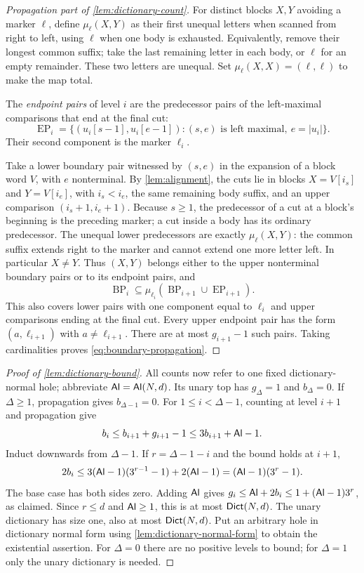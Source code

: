 \begin{proof}[Propagation part of \cref{lem:dictionary-count}]
For distinct blocks $X,Y$ avoiding a marker $\ell$, define
$\mu_\ell(X,Y)$ as their first unequal letters when scanned from right
to left, using $\ell$ when one body is exhausted. Equivalently, remove
their longest common suffix; take the last remaining letter in each body,
or $\ell$ for an empty remainder. These two letters are unequal.
Set $\mu_\ell(X,X)=(\ell,\ell)$ to make the map total.

The \emph{endpoint pairs} of level $i$ are the predecessor pairs of the
left-maximal comparisons that end at the final cut:
\[
 \operatorname{EP}_i=\{(u_i[s-1],u_i[e-1]):
       (s,e)\text{ is left maximal},\ e=|u_i|\}.
\]
Their second component is the marker $\ell_i$.

Take a lower boundary pair witnessed by $(s,e)$ in the expansion of a
block word $V$, with $e$ nonterminal. By \cref{lem:alignment}, the cuts
lie in blocks $X=V[i_s]$ and $Y=V[i_e]$, with $i_s<i_e$, the same
remaining body suffix, and an upper comparison $(i_s+1,i_e+1)$.
Because $s\ge1$, the predecessor of a cut at a block's beginning is the
preceding marker; a cut inside a body has its ordinary predecessor.
The unequal lower predecessors are exactly $\mu_\ell(X,Y)$: the common
suffix extends right to the marker and cannot extend one more letter left.
In particular $X\ne Y$. Thus $(X,Y)$ belongs either to the upper
nonterminal boundary pairs or to its endpoint pairs, and
\[
 \operatorname{BP}_i\subseteq
 \mu_{\ell_i}(\operatorname{BP}_{i+1}\cup\operatorname{EP}_{i+1}).
\]
This also covers lower pairs with one component equal to $\ell_i$ and
upper comparisons ending at the final cut. Every upper endpoint pair
has the form $(a,\ell_{i+1})$ with $a\ne\ell_{i+1}$. There are at most
$g_{i+1}-1$ such pairs. Taking cardinalities proves
\eqref{eq:boundary-propagation}.
\end{proof}

\begin{proof}[Proof of \cref{lem:dictionary-bound}]
All counts now refer to one fixed dictionary-normal hole; abbreviate
$\mathsf{Al}=\mathsf{Al}(N,d)$. Its unary top has
$g_\Delta=1$ and $b_\Delta=0$. If $\Delta\ge1$, propagation gives $b_{\Delta-1}=0$.
For $1\le i<\Delta-1$, counting at level $i+1$ and propagation give
\[
 b_i\le b_{i+1}+g_{i+1}-1\le3b_{i+1}+\mathsf{Al}-1.
\]
Induct downwards from $\Delta-1$. If $r=\Delta-1-i$ and the bound holds at $i+1$,
\[
 2b_i\le3(\mathsf{Al}-1)(3^{r-1}-1)+2(\mathsf{Al}-1)=(\mathsf{Al}-1)(3^r-1).
\]
The base case has both sides zero. Adding $\mathsf{Al}$ gives
$g_i\le \mathsf{Al}+2b_i\le1+(\mathsf{Al}-1)3^r$, as claimed.
Since $r\le d$ and $\mathsf{Al}\ge1$, this is at most $\mathsf{Dict}(N,d)$.
The unary dictionary has size one, also at most $\mathsf{Dict}(N,d)$.
Put an arbitrary hole in dictionary normal form using \cref{lem:dictionary-normal-form}
to obtain the existential assertion. For $\Delta=0$ there are no positive
levels to bound; for $\Delta=1$ only the unary dictionary is needed.
\end{proof}


